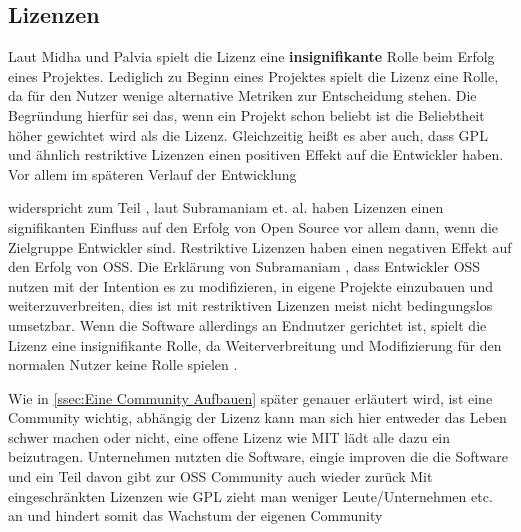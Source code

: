 \subsection{Lizenzen}
\rawidea

\noindent
Laut Midha und Palvia spielt die Lizenz eine \textbf{insignifikante} Rolle beim Erfolg eines Projektes.
Lediglich zu Beginn eines Projektes spielt die Lizenz eine Rolle,
da für den Nutzer wenige alternative Metriken zur Entscheidung stehen. 
Die Begründung hierfür sei das, wenn ein Projekt schon beliebt ist die Beliebtheit höher
gewichtet wird als die Lizenz. Gleichzeitig heißt es aber auch, dass GPL und ähnlich restriktive
Lizenzen einen positiven Effekt auf die Entwickler haben. Vor allem im späteren Verlauf der 
Entwicklung \cite{midhaFactorsAffectingSuccess2012} %


\cite{subramaniamDeterminantsOpenSource2009} widerspricht zum Teil
\cite{midhaFactorsAffectingSuccess2012}, laut Subramaniam et. al.
haben Lizenzen einen signifikanten Einfluss auf den Erfolg von Open Source vor allem dann,
wenn die Zielgruppe Entwickler sind.
Restriktive Lizenzen haben einen negativen Effekt auf den Erfolg von OSS.
Die Erklärung von Subramaniam , dass Entwickler OSS nutzen mit der Intention es zu
modifizieren, in eigene Projekte einzubauen und weiterzuverbreiten, dies ist mit
restriktiven Lizenzen meist nicht bedingungslos umsetzbar. Wenn die Software allerdings an Endnutzer
gerichtet ist, spielt die Lizenz eine insignifikante Rolle, da Weiterverbreitung und Modifizierung
für den normalen Nutzer keine Rolle spielen \cite{subramaniamDeterminantsOpenSource2009}.


Wie in \ref{ssec:Eine Community Aufbauen} später genauer erläutert wird, ist eine Community wichtig, 
abhängig der Lizenz kann man sich hier entweder das Leben schwer machen oder nicht, 
eine offene Lizenz wie MIT lädt alle dazu ein beizutragen. Unternehmen nutzten die Software, 
eingie improven die die Software und ein Teil davon gibt zur OSS Community auch wieder zurück 
\cite{bangerthWhatMakesComputational2013} %
Mit eingeschränkten Lizenzen wie GPL zieht man weniger Leute/Unternehmen etc. an und hindert 
somit das Wachstum der eigenen Community 

